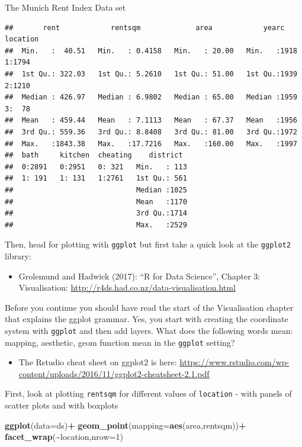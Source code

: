 \documentclass[
  ignorenonframetext,
]{beamer}
\newenvironment{Shaded}{\begin{snugshade}}{\end{snugshade}}
\newcommand{\AttributeTok}[1]{\textcolor[rgb]{0.13,0.29,0.53}{#1}}
\newcommand{\DecValTok}[1]{\textcolor[rgb]{0.00,0.00,0.81}{#1}}
\newcommand{\FunctionTok}[1]{\textcolor[rgb]{0.13,0.29,0.53}{\textbf{#1}}}
\newcommand{\NormalTok}[1]{#1}
\newcommand{\SpecialCharTok}[1]{\textcolor[rgb]{0.81,0.36,0.00}{\textbf{#1}}}
\providecommand{\tightlist}{%
  \setlength{\itemsep}{0pt}\setlength{\parskip}{0pt}}
\begin{document}
\begin{frame}[fragile]
\begin{block}{The Munich Rent Index Data set}
\begin{verbatim}
##       rent            rentsqm             area            yearc      location
##  Min.   :  40.51   Min.   : 0.4158   Min.   : 20.00   Min.   :1918   1:1794  
##  1st Qu.: 322.03   1st Qu.: 5.2610   1st Qu.: 51.00   1st Qu.:1939   2:1210  
##  Median : 426.97   Median : 6.9802   Median : 65.00   Median :1959   3:  78  
##  Mean   : 459.44   Mean   : 7.1113   Mean   : 67.37   Mean   :1956           
##  3rd Qu.: 559.36   3rd Qu.: 8.8408   3rd Qu.: 81.00   3rd Qu.:1972           
##  Max.   :1843.38   Max.   :17.7216   Max.   :160.00   Max.   :1997           
##  bath     kitchen  cheating    district   
##  0:2891   0:2951   0: 321   Min.   : 113  
##  1: 191   1: 131   1:2761   1st Qu.: 561  
##                             Median :1025  
##                             Mean   :1170  
##                             3rd Qu.:1714  
##                             Max.   :2529
\end{verbatim}

Then, head for plotting with \texttt{ggplot} but first take a quick look
at the \texttt{ggplot2} library:

\begin{itemize}
\tightlist
\item
  Grolemund and Hadwick (2017): ``R for Data Science'', Chapter 3:
  Visualisation: \url{http://r4ds.had.co.nz/data-visualisation.html}
\end{itemize}

Before you continue you should have read the start of the Visualisation
chapter that explains the ggplot grammar. Yes, you start with creating
the coordinate system with \texttt{ggplot} and then add layers. What
does the following words mean: mapping, aesthetic, geom function mean in
the \texttt{ggplot} setting?

\begin{itemize}
\tightlist
\item
  The Rstudio cheat sheet on ggplot2 is here:
  \url{https://www.rstudio.com/wp-content/uploads/2016/11/ggplot2-cheatsheet-2.1.pdf}
\end{itemize}

First, look at plotting \texttt{rentsqm} for different values of
\texttt{location} - with panels of scatter plots and with boxplots

\begin{Shaded}
\begin{Highlighting}[]
\FunctionTok{ggplot}\NormalTok{(}\AttributeTok{data=}\NormalTok{ds)}\SpecialCharTok{+}
  \FunctionTok{geom\_point}\NormalTok{(}\AttributeTok{mapping=}\FunctionTok{aes}\NormalTok{(area,rentsqm))}\SpecialCharTok{+}
  \FunctionTok{facet\_wrap}\NormalTok{(}\SpecialCharTok{\textasciitilde{}}\NormalTok{location,}\AttributeTok{nrow=}\DecValTok{1}\NormalTok{)}
\end{Highlighting}
\end{Shaded}


\end{block}
\end{frame}
\end{document}
